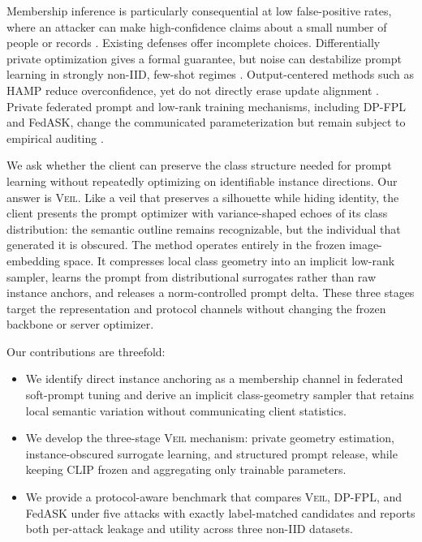 \documentclass[letterpaper]{article}
\newcommand{\method}{\textsc{Veil}}
\begin{document}
Membership inference is particularly consequential at low false-positive rates,
where an attacker can make high-confidence claims about a small number of people
or records \citep{shokri2017membership,carlini2022membership}.  Existing
defenses offer incomplete choices.  Differentially private optimization gives a
formal guarantee, but noise can destabilize prompt learning in strongly non-IID,
few-shot regimes \citep{abadi2016dpsgd,duan2023privateprompt}.  Output-centered
methods such as HAMP reduce overconfidence, yet do not directly erase update
alignment \citep{chen2024hamp}.  Private federated prompt and low-rank training
mechanisms, including DP-FPL and FedASK, change the communicated parameterization
but remain subject to empirical auditing \citep{dpfpl2025,fedask2025}.

We ask whether the client can preserve the class structure needed for prompt
learning without repeatedly optimizing on identifiable instance directions.
Our answer is \method{}.  Like a veil that preserves a silhouette while hiding
identity, the client presents the prompt optimizer with variance-shaped echoes
of its class distribution: the semantic outline remains recognizable, but the
individual that generated it is obscured.
The method operates entirely in the frozen image-embedding space.  It compresses
local class geometry into an implicit low-rank sampler, learns the prompt from
distributional surrogates rather than raw instance anchors, and releases a
norm-controlled prompt delta.  These three stages target the representation and
protocol channels without changing the frozen backbone or server optimizer.

Our contributions are threefold:
\begin{itemize}
    \item We identify direct instance anchoring as a membership channel in
    federated soft-prompt tuning and derive an implicit class-geometry sampler
    that retains local semantic variation without communicating client statistics.
    \item We develop the three-stage \method{} mechanism: private geometry
    estimation, instance-obscured surrogate learning, and structured prompt
    release, while keeping CLIP frozen and aggregating only trainable parameters.
    \item We provide a protocol-aware benchmark that compares \method{}, DP-FPL,
    and FedASK under five attacks with exactly label-matched candidates and reports
    both per-attack leakage and utility across three non-IID datasets.
\end{itemize}
\end{document}
